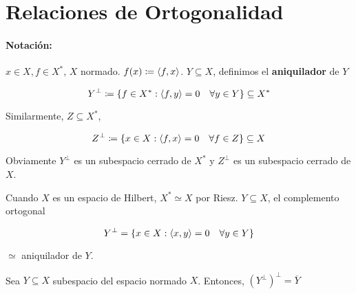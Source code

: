  \section{Relaciones de Ortogonalidad}

 \paragraph*{Notación:} $x\in X,f\in X^*$, $X$ normado. $f(x)\coloneqq \left\langle f,x\right\rangle$. $Y\subseteq X$, definimos el \textbf{aniquilador} de $Y$
 
 \[Y^\perp\coloneqq \{f\in X^*:\left\langle f,y\right\rangle=0\quad\forall y\in Y\}\subseteq X^*\]

 Similarmente, $Z\subseteq X^*$,

 \[Z^\perp\coloneqq \{x\in X:\left\langle f,x\right\rangle=0\quad\forall f\in Z\}\subseteq X\]

 Obviamente $Y^\perp$ es un subespacio cerrado de $X^*$ y $Z^\perp$ es un subespacio cerrado de $X$.

 \begin{fexample}
    Cuando $X$ es un espacio de Hilbert, $X^*\simeq X$ por Riesz. $Y\subseteq X$, el complemento ortogonal 

    \[Y^\perp=\{x\in X:\left\langle x,y\right\rangle=0\quad\forall y\in Y\}\]

    $\simeq$ aniquilador de $Y$.
 \end{fexample}

 \begin{fproposition}
    Sea $Y\subseteq X$ subespacio del espacio normado $X$. Entonces, $(Y^\perp)^\perp=\overline{Y}$
 \end{fproposition}

